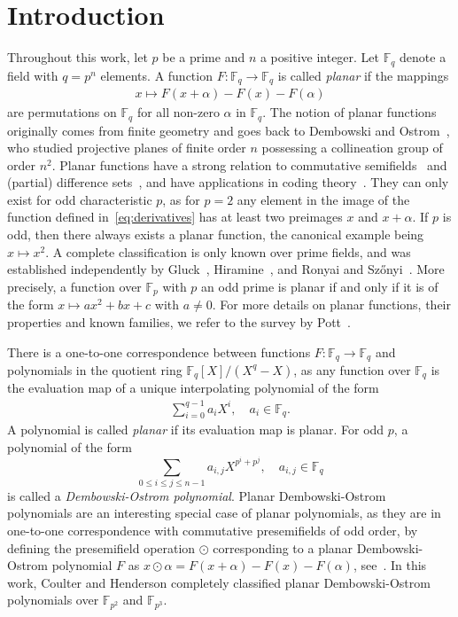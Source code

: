 \documentclass[12pt]{article}
\newcommand{\F}{\mathbb{F}}
\begin{document}
\section{Introduction}
Throughout this work, let $p$ be a prime and $n$ a positive integer. Let $\F_{q}$ denote a field with $q = p^n$ elements. A function $F\colon \F_{q} \rightarrow \F_{q}$ is called \emph{planar} if the mappings
\begin{align}\label{eq:derivatives}x \mapsto F(x+\alpha) - F(x) -F(\alpha)\end{align}
are permutations on $\F_{q}$ for all non-zero $\alpha$ in $\F_{q}$. The notion of planar functions originally comes from finite geometry and goes back to Dembowski and Ostrom~\cite{dembowski1968planes}, who studied projective planes of finite order $n$ possessing a collineation group of order $n^2$. Planar functions have a strong relation to commutative semifields~\cite{coulter2008commutative} and (partial) difference sets~\cite{DBLP:journals/dcc/WengQWX07}, and have applications in coding theory~\cite{DBLP:journals/tit/CarletDY05}. 
They can only exist for odd characteristic $p$, as for $p=2$ any element in the image of the function defined in~\eqref{eq:derivatives} has at least two preimages $x$ and $x+\alpha$. If $p$ is odd, then there always exists a planar function, the canonical example being $x \mapsto x^2$. A complete classification is only known over prime fields, and was established independently by Gluck~\cite{DBLP:journals/dm/Gluck90}, Hiramine~\cite{hiramine1989conjecture}, and Ronyai and Sz{\H{o}}nyi~\cite{ronyai1989planar}. More precisely, a function over $\F_p$ with $p$ an odd prime is planar if and only if it is of the form $x \mapsto ax^2+bx+c$  with $a \neq 0$. For more details on planar functions, their properties and known families, we refer to the survey by Pott~\cite{DBLP:journals/dcc/Pott16}. 

There is a one-to-one correspondence between functions $F \colon \F_{q} \rightarrow \F_{q}$ and polynomials in the quotient ring $\F_{q}[X] /(X^{q}-X)$, as any function over $\F_{q}$ is the evaluation map of a unique interpolating polynomial of the form
\begin{align}
\label{eq:univariate_representation}
    \sum_{i=0}^{q-1} a_i X^i, \quad a_i \in \F_{q}.
\end{align}
A polynomial is called \emph{planar} if its evaluation map is planar. For odd $p$, a polynomial of the form
\[\sum_{0 \leq i \leq j \leq n-1} a_{i,j}X^{p^{i}+p^j}, \quad a_{i,j} \in \F_{q}\]
is called a \emph{Dembowski-Ostrom polynomial}. Planar Dembowski-Ostrom polynomials are an interesting special case of planar polynomials, as they are in one-to-one correspondence with commutative presemifields of odd order, by defining the presemifield operation $\odot$ corresponding to a planar Dembowski-Ostrom polynomial $F$ as $x \odot \alpha = F(x+\alpha) - F(x) - F(\alpha)$, see~\cite{coulter2008commutative}. In this work, Coulter and Henderson completely classified planar Dembowski-Ostrom polynomials over $\F_{p^2}$ and $\F_{p^3}$. 
\end{document}
